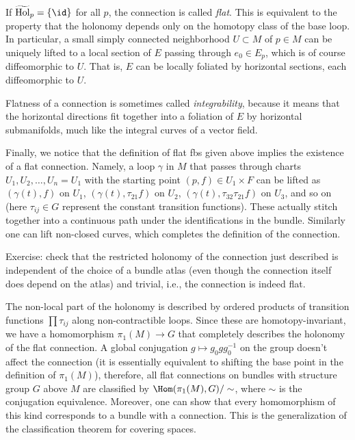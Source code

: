 \begin{example}
	If $\widetilde{\mathrm{Hol}}_p=\{\id\}$ for all $p$, the connection is called \emph{flat}. This is equivalent to the property that the holonomy depends only on the homotopy class of the base loop. In particular, a small simply connected neighborhood $U\subset M$ of $p\in M$ can be uniquely lifted to a local section of $E$ passing through $e_0\in E_p$, which is of course diffeomorphic to $U$. That is, $E$ can be locally foliated by horizontal sections, each diffeomorphic to $U$. 
	
	Flatness of a connection is sometimes called \emph{integrability}, because it means that the horizontal directions fit together into a foliation of $E$ by horizontal submanifolds, much like the integral curves of a vector field.
	
	Finally, we notice that the definition of flat \glspl{fb} given above implies the existence of a flat connection. Namely, a loop $\gamma$ in $M$ that passes through charts $U_1,U_2,\ldots,U_n=U_1$ with the starting point $(p,f)\in U_1\times F$ can be lifted as $(\gamma(t),f)$ on $U_1$, $(\gamma(t),\tau_{21}f)$ on $U_2$, $(\gamma(t),\tau_{32}\tau_{21}f)$ on $U_3$, and so on (here $\tau_{ij}\in G$ represent the constant transition functions). These actually stitch together into a continuous path under the identifications in the bundle. Similarly one can lift non-closed curves, which completes the definition of the connection.
	
	Exercise: check that the restricted holonomy of the connection just described is independent of the choice of a bundle atlas (even though the connection itself does depend on the atlas) and trivial, i.e., the connection is indeed flat.
	
	The non-local part of the holonomy is described by ordered products of transition functions $\prod \tau_{ij}$ along non-contractible loops. Since these are homotopy-invariant, we have a homomorphism $\pi_1(M)\to G$ that completely describes the holonomy of the flat connection. A global conjugation $g\mapsto g_0 g g_0^{-1}$ on the group doesn't affect the connection (it is essentially equivalent to shifting the base point in the definition of $\pi_1(M)$), therefore, all flat connections on bundles with structure group $G$ above $M$ are classified by $\Hom(\pi_1(M),G)/\sim$, where $\sim$ is the conjugation equivalence. Moreover, one can show that every homomorphism of this kind corresponds to a bundle with a connection. This is the generalization of the classification theorem for covering spaces.
	

\end{example}
